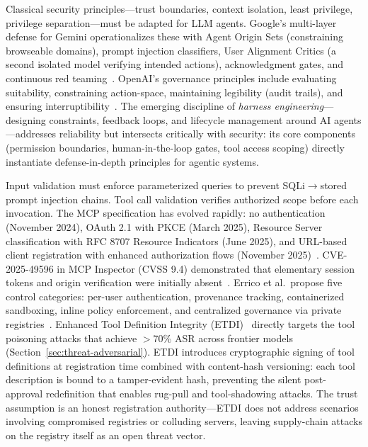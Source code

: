 \begin{description}[style=unboxed,leftmargin=0.5em,labelindent=0em,nosep]
\item[Architecture-level defenses.] Classical security principles---trust boundaries, context isolation, least privilege, privilege separation---must be adapted for LLM agents. Google's multi-layer defense for Gemini operationalizes these with Agent Origin Sets (constraining browseable domains), prompt injection classifiers, User Alignment Critics (a second isolated model verifying intended actions), acknowledgment gates, and continuous red teaming~\cite{google2025geminidefense}. OpenAI's governance principles include evaluating suitability, constraining action-space, maintaining legibility (audit trails), and ensuring interruptibility~\cite{shavit2024agenticgovernance}. The emerging discipline of \emph{harness engineering}---designing constraints, feedback loops, and lifecycle management around AI agents---addresses reliability but intersects critically with security: its core components (permission boundaries, human-in-the-loop gates, tool access scoping) directly instantiate defense-in-depth principles for agentic systems.

\item[MCP-specific security.] Input validation must enforce parameterized queries to prevent SQLi$\to$stored prompt injection chains. Tool call validation verifies authorized scope before each invocation. The MCP specification has evolved rapidly: no authentication (November 2024), OAuth 2.1 with PKCE (March 2025), Resource Server classification with RFC 8707 Resource Indicators (June 2025), and URL-based client registration with enhanced authorization flows (November 2025)~\cite{mcpspec2025}. CVE-2025-49596 in MCP Inspector (CVSS 9.4) demonstrated that elementary session tokens and origin verification were initially absent~\cite{oligo2025inspector}. Errico et al.\ propose five control categories: per-user authentication, provenance tracking, containerized sandboxing, inline policy enforcement, and centralized governance via private registries~\cite{errico2025mcpsecurity}. Enhanced Tool Definition Integrity (ETDI)~\cite{bhatt2025etdi} directly targets the tool poisoning attacks that achieve $>$70\% ASR across frontier models (Section~\ref{sec:threat-adversarial}). ETDI introduces cryptographic signing of tool definitions at registration time combined with content-hash versioning: each tool description is bound to a tamper-evident hash, preventing the silent post-approval redefinition that enables rug-pull and tool-shadowing attacks. The trust assumption is an honest registration authority---ETDI does not address scenarios involving compromised registries or colluding servers, leaving supply-chain attacks on the registry itself as an open threat vector.


\end{description}
